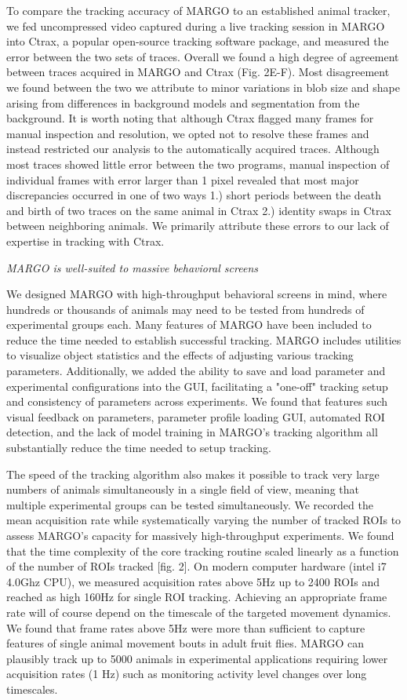 \documentclass[10pt]{article}
\begin{document}
\begin{multicols}{2}
To compare the tracking accuracy of MARGO to an established animal tracker, we fed uncompressed video captured during a live tracking session in MARGO into Ctrax, a popular open-source tracking software package, and measured the error between the two sets of traces. Overall we found a high degree of agreement between traces acquired in MARGO and Ctrax (Fig. 2E-F). Most disagreement we found between the two we attribute to minor variations in blob size and shape arising from differences in background models and segmentation from the background. It is worth noting that although Ctrax flagged many frames for manual inspection and resolution, we opted not to resolve these frames and instead restricted our analysis to the automatically acquired traces. Although most traces showed little error between the two programs, manual inspection of individual frames with error larger than 1 pixel revealed that most major discrepancies occurred in one of two ways 1.) short periods between the death and birth of two traces on the same animal in Ctrax 2.) identity swaps in Ctrax between neighboring animals. We primarily attribute these errors to our lack of expertise in tracking with Ctrax.

\textit{MARGO is well-suited to massive behavioral screens}

We designed MARGO with high-throughput behavioral screens in mind, where hundreds or thousands of animals may need to be tested from hundreds of experimental groups each. Many features of MARGO have been included to reduce the time needed to establish successful tracking. MARGO includes utilities to visualize object statistics and the effects of adjusting various tracking parameters. Additionally, we added the ability to save and load parameter and experimental configurations into the GUI, facilitating a "one-off" tracking setup and consistency of parameters across experiments. We found that features such visual feedback on parameters, parameter profile loading GUI, automated ROI detection, and the lack of model training in MARGO's tracking algorithm  all substantially reduce the time needed to setup tracking. 

The speed of the tracking algorithm also makes it possible to track very large numbers of animals simultaneously in a single field of view, meaning that multiple experimental groups can be tested simultaneously. We recorded the mean acquisition rate while systematically varying the number of tracked ROIs to assess MARGO’s capacity for massively high-throughput experiments. We found that the time complexity of the core tracking routine scaled linearly as a function of the number of ROIs tracked [fig. 2]. On modern computer hardware (intel i7 4.0Ghz CPU), we measured acquisition rates above 5Hz up to 2400 ROIs and reached as high 160Hz for single ROI tracking. Achieving an appropriate frame rate will of course depend on the timescale of the targeted movement dynamics. We found that frame rates above 5Hz were more than sufficient to capture features of single animal movement bouts in adult fruit flies. MARGO can plausibly track up to 5000 animals in experimental applications requiring lower acquisition rates (1 Hz) such as monitoring activity level changes over long timescales. 


\end{multicols}
\end{document}
